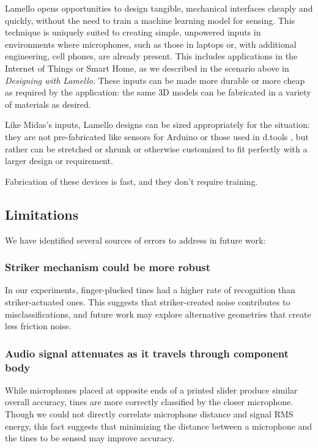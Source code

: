     Lamello opens opportunities to design tangible, mechanical interfaces cheaply and quickly, without the need to train a machine learning model for sensing. This technique is uniquely suited to creating simple, unpowered inputs in environments where microphones, such as those in laptops or, with additional engineering, cell phones, are already present. This includes applications in the Internet of Things or Smart Home, as we described in the scenario above in \emph{Designing with Lamello}. These inputs can be made more durable or more cheap as required by the application: the same 3D models can be fabricated in a variety of materials as desired.
    
    Like Midas's inputs, Lamello designs can be sized appropriately for the situation: they are not pre-fabricated like sensors for Arduino \cite{arduino} or those used in d.tools \cite{hartmann-dtools}, but rather can be stretched or shrunk or otherwise customized to fit perfectly with a larger design or requirement.
    
    Fabrication of these devices is fast, and they don't require training.
    
    \subsection{Limitations}
    
     We have identified several sources of errors to address in future work:

    \subsubsection{Striker mechanism could be more robust}
    In our experiments, finger-plucked tines had a higher rate of recognition than striker-actuated ones. This suggests that striker-created noise contributes to misclassifications, and future work may explore alternative geometries that create less friction noise.

    \subsubsection{Audio signal attenuates as it travels through component body}
    While microphones placed at opposite ends of a printed slider produce similar overall accuracy, tines are more correctly classified by the closer microphone. Though we could not directly correlate microphone distance and signal RMS energy, this fact suggests that minimizing the distance between a microphone and the tines to be sensed may improve accuracy.


